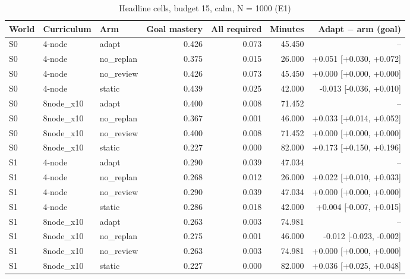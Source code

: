 \begin{table}[htbp]
\centering\small
\caption{Headline cells, budget 15, calm, N = 1000 (E1)}
\label{tab:t7}
\begin{tabular}{lllrrrr}
\toprule
World & Curriculum & Arm & Goal mastery & All required & Minutes & Adapt $-$ arm (goal) \\
\midrule
S0 & 4-node & adapt & 0.426 & 0.073 & 45.450 & -- \\
S0 & 4-node & no\_replan & 0.375 & 0.015 & 26.000 & +0.051 [+0.030, +0.072] \\
S0 & 4-node & no\_review & 0.426 & 0.073 & 45.450 & +0.000 [+0.000, +0.000] \\
S0 & 4-node & static & 0.439 & 0.025 & 42.000 & -0.013 [-0.036, +0.010] \\
S0 & 8node\_x10 & adapt & 0.400 & 0.008 & 71.452 & -- \\
S0 & 8node\_x10 & no\_replan & 0.367 & 0.001 & 46.000 & +0.033 [+0.014, +0.052] \\
S0 & 8node\_x10 & no\_review & 0.400 & 0.008 & 71.452 & +0.000 [+0.000, +0.000] \\
S0 & 8node\_x10 & static & 0.227 & 0.000 & 82.000 & +0.173 [+0.150, +0.196] \\
S1 & 4-node & adapt & 0.290 & 0.039 & 47.034 & -- \\
S1 & 4-node & no\_replan & 0.268 & 0.012 & 26.000 & +0.022 [+0.010, +0.033] \\
S1 & 4-node & no\_review & 0.290 & 0.039 & 47.034 & +0.000 [+0.000, +0.000] \\
S1 & 4-node & static & 0.286 & 0.018 & 42.000 & +0.004 [-0.007, +0.015] \\
S1 & 8node\_x10 & adapt & 0.263 & 0.003 & 74.981 & -- \\
S1 & 8node\_x10 & no\_replan & 0.275 & 0.001 & 46.000 & -0.012 [-0.023, -0.002] \\
S1 & 8node\_x10 & no\_review & 0.263 & 0.003 & 74.981 & +0.000 [+0.000, +0.000] \\
S1 & 8node\_x10 & static & 0.227 & 0.000 & 82.000 & +0.036 [+0.025, +0.048] \\
\bottomrule
\end{tabular}
\end{table}
